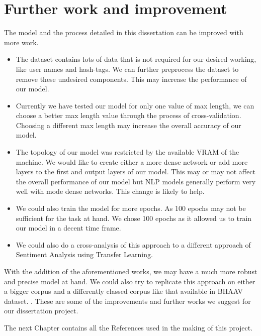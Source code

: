 \documentclass[a4paper, 12pt]{article}
\begin{document}
\begin{sloppypar}
  \section{Further work and improvement}
  The model and the process detailed in this dissertation can be improved with more work. 
  \begin{itemize}
  \item The dataset contains lots of data that is not required for our desired working, like user names and hash-tags. We can further preprocess the dataset to remove these undesired components. This may increase the performance of our model.
  
  \item Currently we have tested our model for only one value of max length, we can choose a better max length value through the process of cross-validation. Choosing a different max length may increase the overall accuracy of our model.
  
  \item The topology of our model was restricted by the available VRAM of the machine. We would like to create either a more dense network or add more layers to the first and output layers of our model. This may or may not affect the overall performance of our model but NLP models generally perform very well with mode dense networks. This change is likely to help.
  
  \item We could also train the model for more epochs. As 100 epochs may not be sufficient for the task at hand. We chose 100 epochs as it allowed us to train our model in a decent time frame.
  
  \item We could also do a cross-analysis of this approach to a different approach of Sentiment Analysis using Transfer Learning.
  \end{itemize}   
  With the addition of the aforementioned works, we may have a much more robust and precise model at hand. We could also try to replicate this approach on either a bigger corpus and a differently classed corpus like that available in BHAAV dataset. \cite{kumar_bhaav_2019}. These are some of the improvements and further works we suggest for our dissertation project.
  
The next Chapter contains all the References used in the making of this project.

\clearpage
\printbibliography[heading=bibintoc]
\clearpage

\end{sloppypar}
\end{document}
